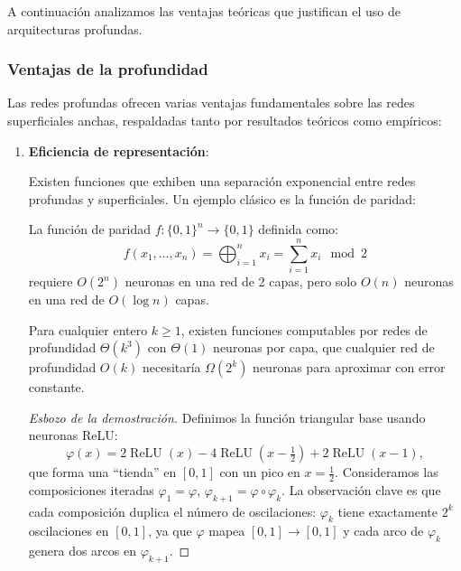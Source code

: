 A continuación analizamos las ventajas teóricas que justifican el uso de arquitecturas profundas.

\subsubsection{Ventajas de la profundidad}

Las redes profundas ofrecen varias ventajas fundamentales sobre las redes superficiales anchas, respaldadas tanto por resultados teóricos como empíricos:

\begin{enumerate}
	\item \textbf{Eficiencia de representación}:

	Existen funciones que exhiben una separación exponencial entre redes profundas y superficiales. Un ejemplo clásico es la función de paridad:

	\begin{example}
		La función de paridad \(f: \{0,1\}^n \to \{0,1\}\) definida como:
		\[
			f(x_1, \ldots, x_n) = \bigoplus_{i=1}^n x_i = \sum_{i=1}^n x_i \mod 2
		\]
		requiere \(O(2^n)\) neuronas en una red de 2 capas, pero solo \(O(n)\) neuronas en una red de \(O(\log n)\) capas.
	\end{example}

	\begin{theorem}
		Para cualquier entero \(k \geq 1\), existen funciones computables por redes de profundidad \(\Theta(k^3)\) con \(\Theta(1)\) neuronas por capa, que cualquier red de profundidad \(O(k)\) necesitaría \(\Omega(2^k)\) neuronas para aproximar con error constante.
	\end{theorem}

	\begin{proof}[Esbozo de la demostración]
		Definimos la función triangular base usando neuronas ReLU:
		\[
			\varphi(x) = 2\operatorname{ReLU}(x) - 4\operatorname{ReLU}\!\left(x - \tfrac{1}{2}\right) + 2\operatorname{ReLU}(x - 1),
		\]
		que forma una ``tienda'' en $[0,1]$ con un pico en $x = \tfrac{1}{2}$. Consideramos las composiciones iteradas $\varphi_1 = \varphi$, $\varphi_{k+1} = \varphi \circ \varphi_k$. La observación clave es que cada composición duplica el número de oscilaciones: $\varphi_k$ tiene exactamente $2^k$ oscilaciones en $[0,1]$, ya que $\varphi$ mapea $[0,1] \to [0,1]$ y cada arco de $\varphi_k$ genera dos arcos en $\varphi_{k+1}$.


\end{proof}
\end{enumerate}
